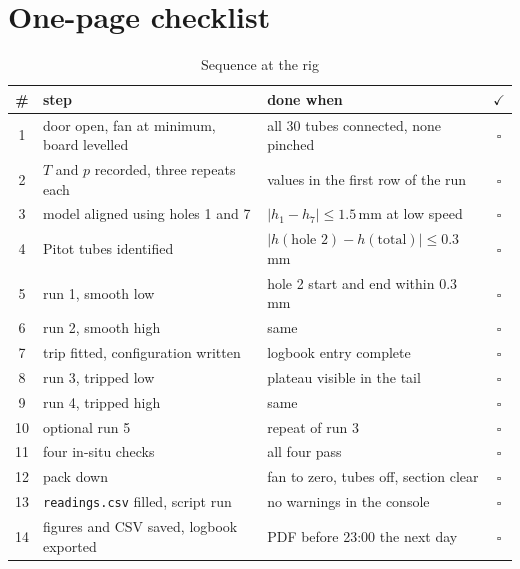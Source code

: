 \documentclass[11pt,a4paper]{article}
\begin{document}
\section{One-page checklist}

\begin{table}[H]
\centering
\caption{Sequence at the rig}
\small
\begin{tabularx}{\textwidth}{@{}c X p{5.0cm} c@{}}
\toprule
\# & step & done when & $\checkmark$ \\
\midrule
1 & door open, fan at minimum, board levelled & all 30 tubes connected, none pinched & $\square$ \\
2 & $T$ and $p$ recorded, three repeats each & values in the first row of the run & $\square$ \\
3 & model aligned using holes 1 and 7 & $|h_1 - h_7| \leq 1.5$\,mm at low speed & $\square$ \\
4 & Pitot tubes identified & $|h(\text{hole 2}) - h(\text{total})| \leq 0.3$\,mm & $\square$ \\
5 & run 1, smooth low & hole 2 start and end within 0.3\,mm & $\square$ \\
6 & run 2, smooth high & same & $\square$ \\
7 & trip fitted, configuration written & logbook entry complete & $\square$ \\
8 & run 3, tripped low & plateau visible in the tail & $\square$ \\
9 & run 4, tripped high & same & $\square$ \\
10 & optional run 5 & repeat of run 3 & $\square$ \\
11 & four in-situ checks & all four pass & $\square$ \\
12 & pack down & fan to zero, tubes off, section clear & $\square$ \\
13 & \texttt{readings.csv} filled, script run & no warnings in the console & $\square$ \\
14 & figures and CSV saved, logbook exported & PDF before 23:00 the next day & $\square$ \\
\bottomrule
\end{tabularx}
\end{table}
\end{document}
